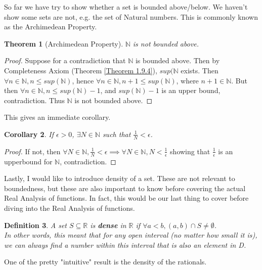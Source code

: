 \documentclass{book}
\newtheorem{theorem}{Theorem}[section]
\newtheorem{definition}[theorem]{Definition}
\newtheorem{corollary}[theorem]{Corollary}
\begin{document}
So far we have try to show whether a set is bounded above/below. We haven't show some sets are not, e.g. the set of Natural numbers. This is commonly known as the Archimedean Property.

\begin{theorem}[Archimedean Property]
    $\mathbb{N}$ is not bounded above.
\end{theorem}

\begin{proof}
    Suppose for a contradiction that $\mathbb{N}$ is bounded above. Then by Completeness Axiom (Theorem \ref{Theorem 1.9.4}), $sup(\mathbb{N}$ exists. Then $\forall n \in \mathbb{N}, n \leq sup(\mathbb{N})$, hence $\forall n \in \mathbb{N}, n + 1 \leq sup(\mathbb{N})$, where $n + 1 \in \mathbb{N}$. But then $\forall n \in \mathbb{N}, n \leq sup(\mathbb{N}) - 1$, and $sup(\mathbb{N}) - 1$ is an upper bound, contradiction. Thus $\mathbb{N}$ is not bounded above.
\end{proof}

This gives an immediate corollary.

\begin{corollary} \label{Corollary 1.9.7}
    If $\epsilon > 0$, $\exists N \in \mathbb{N}$ such that $\frac{1}{N} < \epsilon$.
\end{corollary}

\begin{proof}
    If not, then $\forall N \in \mathbb{N}, \frac{1}{N} < \epsilon \implies \forall N \in \mathbb{N}, N < \frac{1}{\epsilon}$ showing that $\frac{1}{\epsilon}$ is an upperbound for $\mathbb{N}$, contradiction.
\end{proof}

Lastly, I would like to introduce density of a set. These are not relevant to boundedness, but these are also important to know before covering the actual Real Analysis of functions. In fact, this would be our last thing to cover before diving into the Real Analysis of functions.

\begin{definition}
    A set $S \subseteq \mathbb{R}$ is \textbf{dense} in $\mathbb{R}$ if $\forall a < b, (a, b) \cap S \neq \emptyset$. \\
    In other words, this meant that for any open interval (no matter how small it is), we can always find a number within this interval that is also an element in D.
\end{definition}

One of the pretty "intuitive" result is the density of the rationals.
\end{document}
